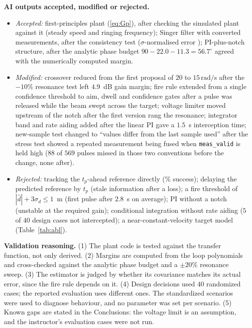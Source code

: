 \documentclass[conference]{IEEEtran}
\newcommand{\rads}{\,\mathrm{rad/s}}
\begin{document}
\textbf{AI outputs accepted, modified or rejected.}
\begin{itemize}
\item \emph{Accepted:} first-principles plant (\ref{eq:Gp}), after checking the simulated plant against it (steady speed and ringing frequency); Singer filter with converted measurements, after the consistency test ($\sigma$-normalised error \EvZ); PI-plus-notch structure, after the analytic phase budget $90-22.0-11.3=56.7^\circ$ agreed with the numerically computed margin.
\item \emph{Modified:} crossover reduced from the first proposal of $20$ to $15\rads$ after the $-10$\% resonance test left $4.9$~dB gain margin; fire rule extended from a single confidence threshold to aim, dwell and confidence gates after a pulse was released while the beam swept across the target; voltage limiter moved upstream of the notch after the first version rang the resonance; integrator band and rate aiding added after the linear PI gave a $1.5$~s interception time; new-sample test changed to ``values differ from the last sample used'' after the stress test showed a repeated measurement being fused when \texttt{meas\_valid} is held high ($88$ of $569$ pulses missed in those two conventions before the change, none after).
\item \emph{Rejected:} tracking the $t_p$-ahead reference directly (\AblLeadSucc\% success); delaying the predicted reference by $t_p$ (stale information after a loss); a fire threshold of $|\hat d|+3\sigma_d\le1$~m (first pulse after $2.8$~s on average); PI without a notch (unstable at the required gain); conditional integration without rate aiding ($5$ of $40$ design cases not intercepted); a near-constant-velocity target model (Table~\ref{tab:abl}).
\end{itemize}

\textbf{Validation reasoning.} (1) The plant code is tested against the transfer function, not only derived. (2) Margins are computed from the loop polynomials and cross-checked against the analytic phase budget and a $\pm20$\% resonance sweep. (3) The estimator is judged by whether its covariance matches its actual error, since the fire rule depends on it. (4) Design decisions used $40$ randomized cases; the reported evaluation uses \EvN{} different ones. The standardized scenarios were used to diagnose behaviour, and no parameter was set per scenario. (5) Known gaps are stated in the Conclusions: the voltage limit is an assumption, and the instructor's evaluation cases were not run.
\end{document}
